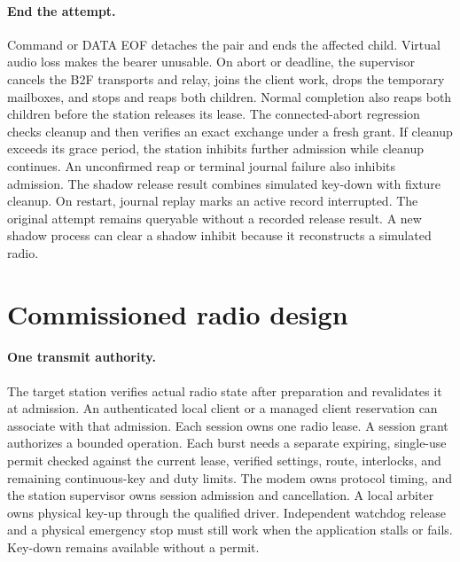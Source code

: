 \paragraph{End the attempt.}
Command or DATA EOF detaches the pair and ends the affected child. Virtual
audio loss makes the bearer unusable. On abort or deadline, the supervisor
cancels the B2F transports and relay, joins the client work, drops the
temporary mailboxes, and stops and reaps both children. Normal completion
also reaps both children before the station releases its lease. The
connected-abort regression checks cleanup and then verifies an exact
exchange under a fresh grant. If cleanup exceeds its grace period,
the station inhibits further admission while cleanup continues. An
unconfirmed reap or terminal journal failure also inhibits admission.
The shadow release result combines simulated key-down with fixture cleanup.
On restart, journal replay marks an active record interrupted. The
original attempt remains queryable without a recorded release result.
A new shadow process can clear a shadow inhibit because it reconstructs a
simulated radio.

\section{Commissioned radio design}
\label{sec:live-safety}

\paragraph{One transmit authority.}
The target station verifies actual radio state after preparation and
revalidates it at admission. An authenticated local client or a managed
client reservation can associate with that admission. Each session owns one
radio lease. A session grant authorizes a bounded operation. Each burst
needs a separate expiring, single-use permit checked against the current
lease, verified settings, route, interlocks, and remaining continuous-key
and duty limits. The modem owns protocol timing, and the station supervisor
owns session admission and cancellation. A local arbiter owns physical
key-up through the qualified driver. Independent watchdog release and a
physical emergency stop must still work when the application stalls or
fails. Key-down remains available without a permit.

